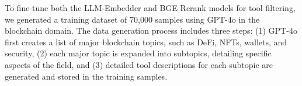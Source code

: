 \documentclass[runningheads]{llncs}
\begin{document}

To fine-tune both the LLM-Embedder and BGE Rerank models for tool filtering, we generated a training dataset of 70,000 samples using GPT-4o in the blockchain domain. The data generation process includes three steps: (1) GPT-4o first creates a list of major blockchain topics, such as DeFi, NFTs, wallets, and security, (2) each major topic is expanded into subtopics, detailing specific aspects of the field, and (3) detailed tool descriptions for each subtopic are generated and stored in the training samples.
\end{document}
